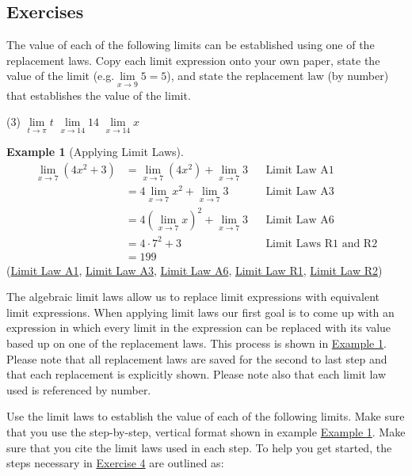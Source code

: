 \documentclass[10pt,oneside,]{book}
\theoremstyle{plain}
\theoremstyle{definition}
\newtheorem{example}[theorem]{Example}
\numberwithin{equation}{section}
\begin{document}
\subsection[Exercises]{Exercises}\label{exercises-6}
\hypertarget{exercisegroup-16}{\null}The value of each of the following limits can be established using one of the replacement laws. Copy each limit expression onto your own paper, state the value of the limit (e.g.\@ \(\lim\limits_{x\to9}5=5\)), and state the replacement law (by number) that establishes the value of the limit.%
\par
\begin{exercisegroup}(3)
\exercise[1.]\hypertarget{exercise-66}{\null}\(\lim\limits_{t\to\pi}t\)%
\exercise[2.]\hypertarget{exercise-67}{\null}\(\lim\limits_{x\to14}14\)%
\exercise[3.]\hypertarget{exercise-68}{\null}\(\lim\limits_{x\to14}x\)%
\end{exercisegroup}
\par\smallskip\noindent
\begin{example}[Applying Limit Laws]\label{example-apply-limit-laws}
\begin{align*}
\lim_{x\to7}\left(4x^2+3\right)&=\lim_{x\to7}\left(4x^2\right)+\lim_{x\to7}3&&\text{Limit Law A1}\\
&=4\lim_{x\to7}x^2+\lim_{x\to7}3&&\text{Limit Law A3}\\
&=4\left(\lim_{x\to7}x\right)^2+\lim_{x\to7}3&&\text{Limit Law A6}\\
&=4\cdot7^2+3&&\text{Limit Laws R1 and R2}\\
&=199
\end{align*}(\hyperref[lla1]{Limit Law A1}, \hyperref[lla3]{Limit Law A3}, \hyperref[lla6]{Limit Law A6}, \hyperref[llr1]{Limit Law R1}, \hyperref[llr2]{Limit Law R2})%
\end{example}
\hypertarget{exercisegroup-17}{\null}The algebraic limit laws allow us to replace limit expressions with equivalent limit expressions. When applying limit laws our first goal is to come up with an expression in which every limit in the expression can be replaced with its value based up on one of the replacement laws. This process is shown in \hyperref[example-apply-limit-laws]{Example \ref{example-apply-limit-laws}}. Please note that all replacement laws are saved for the second to last step and that each replacement is explicitly shown. Please note also that each limit law used is referenced by number.%
\par
Use the limit laws to establish the value of each of the following limits. Make sure that you use the step-by-step, vertical format shown in example \hyperref[example-apply-limit-laws]{Example \ref{example-apply-limit-laws}}. Make sure that you cite the limit laws used in each step. To help you get started, the steps necessary in \hyperlink{exercise-first-apply-limit-laws}{Exercise 4} are outlined as:%
\end{document}
